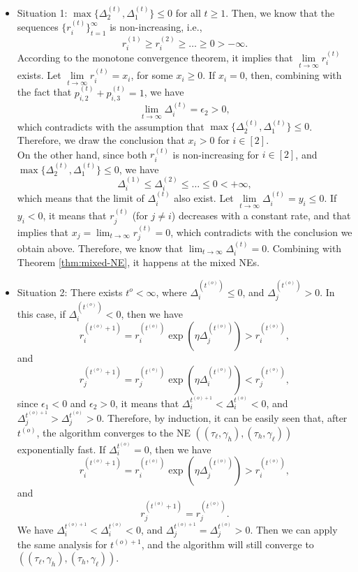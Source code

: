 \begin{itemize}
    \item Situation 1: $\max\{\Delta^{(t)}_2,\Delta^{(t)}_1\}\leq 0$ for all $t\geq 1$. Then, we know that the sequences $\{r_{i}^{(t)}\}_{t=1}^{\infty}$ is non-increasing, i.e., 
    $$ r_{i}^{(1)}\geq  r_{i}^{(2)}\geq \dots \geq 0>-\infty.$$
    According to the monotone convergence theorem, it implies that $\lim\limits_{t\rightarrow \infty}r_{i}^{(t)}$ exists. Let $\lim\limits_{t\rightarrow \infty}r_{i}^{(t)}=x_i$, for some $x_i\geq 0$. If $x_i=0$, then, combining with the fact that  $p_{i,2}^{(t)}+p_{i,3}^{(t)}=1$, we have 
$$\lim\limits_{t\rightarrow \infty} \Delta_{i}^{(t)}= \epsilon_2>0,$$    
which contradicts with the assumption that $\max\{\Delta^{(t)}_{2},\Delta_{1}^{(t)}\}\leq 0$. Therefore, we draw the conclusion that $x_i>0$ for $i\in[2]$. \\

On the other hand, since both $r_i^{(t)}$ is non-increasing for $i\in[2]$, and $\max\{\Delta^{(t)}_2,\Delta^{(t)}_1\}\leq 0$, we have 
$$\Delta_i^{(1)}\leq \Delta_i^{(2)}\leq \dots\leq 0<+\infty,  $$
which means that the limit of $\Delta_{i}^{(t)}$ also exist. 
Let $\lim\limits_{t\rightarrow \infty} \Delta^{(t)}_i=y_i\leq 0$. If $y_i<0$, it means that $r_j^{(t)}$ (for $j\not=i$) decreases with a constant rate, and that implies that  $x_j=\lim_{t\rightarrow \infty} r^{(t)}_j=0$, which contradicts with the conclusion we obtain above. Therefore, we know that $\lim_{t\rightarrow \infty} \Delta^{(t)}_i=0$. Combining with Theorem \ref{thm:mixed-NE}, it happens at the mixed NEs. 
\item Situation 2: There exists $t^{o}<\infty$, where $\Delta_i^{(t^{(o)})}\leq 0$, and  $\Delta_j^{(t^{(o)})}> 0$. In this case, if $\Delta_i^{(t^{(o)})}< 0$, then we have 
$$r_i^{(t^{(o)}+1)} = r_i^{(t^{(o)})}\exp\left(\eta \Delta_j^{(t^{(o)})}\right)>r_i^{(t^{(o)})}, $$
and 
$$r_j^{(t^{(o)}+1)} = r_j^{(t^{(o)})}\exp\left(\eta \Delta_i^{(t^{(o)})}\right)<r_j^{(t^{(o)})}, $$
since $\epsilon_1<0$ and $\epsilon_2>0$, it means that $\Delta^{t^{(o)+1}}_{i}<\Delta^{t^{(o)}}_{i}<0$, and  $\Delta^{t^{(o)+1}}_{j}>\Delta^{t^{(o)}}_{j}>0$. Therefore, by induction, it can be easily seen that, after $t^{(o)}$, the algorithm converges to the NE $((\tau_{\ell},\gamma_h),(\tau_{h},\gamma_{\ell}))$ exponentially fast. If $\Delta_{i}^{t^{(o)}}=0$, then we have 
$$r_i^{(t^{(o)}+1)} = r_i^{(t^{(o)})}\exp\left(\eta \Delta_j^{(t^{(o)})}\right)>r_i^{(t^{(o)})}, $$
and 
$$r_j^{(t^{(o)}+1)} = r_j^{(t^{(o)})}.$$
We have $\Delta^{t^{(o)+1}}_{i}<\Delta^{t^{(o)}}_{i}<0$, and  $\Delta^{t^{(o)+1}}_{j}=\Delta^{t^{(o)}}_{j}>0$. Then we can apply the same analysis for $t^{(o)+1}$, and the algorithm will still converge to $((\tau_{\ell},\gamma_h),(\tau_{h},\gamma_{\ell}))$.
\end{itemize}
